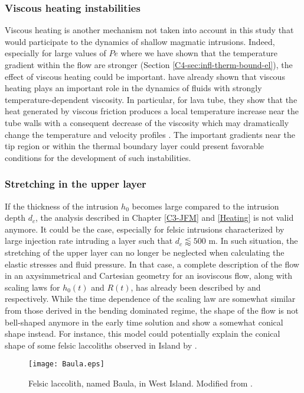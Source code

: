 \subsubsection*{Viscous heating instabilities}

Viscous heating  is another mechanism  not taken into account  in this
study  that would  participate  to the  dynamics  of shallow  magmatic
intrusions. Indeed, especially for large  values of $Pe$ where we have
shown  that the  temperature  gradient within  the  flow are  stronger
(Section  \ref{C4-sec:infl-therm-bound-el}),  the  effect  of  viscous
heating could  be important.  \citet{Costa:2005bq} have  already shown
that viscous heating plays an important role in the dynamics of fluids
with strongly temperature-dependent viscosity. In particular, for lava
tube, they show that the heat generated by viscous friction produces a
local  temperature increase  near  the tube  walls  with a  consequent
decrease  of   the  viscosity   which  may  dramatically   change  the
temperature             and              velocity             profiles
\citep{Costa:2002cj,Costa:2003wk,Costa:2005bq}.      The     important
gradients near  the tip  region or within  the thermal  boundary layer
could  present  favorable  conditions  for  the  development  of  such
instabilities.

\subsubsection*{Stretching in the upper layer}

If the thickness of the intrusion  $h_0$ becomes large compared to the
intrusion depth $d_c$, the  analysis described in Chapter \ref{C3-JFM}
and  \ref{Heating}  is  not  valid  anymore. It  could  be  the  case,
especially for felsic intrusions characterized by large injection rate
intruding a layer such that $d_c\lessapprox 500$ m. In such situation,
the stretching  of the  upper layer  can no  longer be  neglected when
calculating the elastic stresses and  fluid pressure.  In that case, a
complete description  of the flow  in an axysimmetrical  and Cartesian
geometry for an isoviscous flow,  along with scaling laws for $h_0(t)$
and $R(t)$,  has already  been described by  \citet{Lister:2013ia} and
\citet{Anonymous:QWXp_4JV} respectively.  While the time dependence of
the scaling law are somewhat similar from those derived in the bending
dominated regime, the shape of the  flow is not bell-shaped anymore in
the early time solution and show a somewhat conical shape instead. For
instance, this  model could potentially  explain the conical  shape of
some     felsic      laccoliths     observed     in      Island     by
\citet{Anonymous:jHnLP36x}.
\begin{figure}[h!]
  \begin{center}
    \graphicspath{ {/Users/thorey/Documents/These/Manuscript/Figure/Chapter7/} }
    \texttt{[image: Baula.eps]}
    \caption{Felsic laccolith, named Baula,  in West Island.  Modified
      from \citet{Anonymous:jHnLP36x}.}
    \label{C7-Baula}
  \end{center}
\end{figure}

